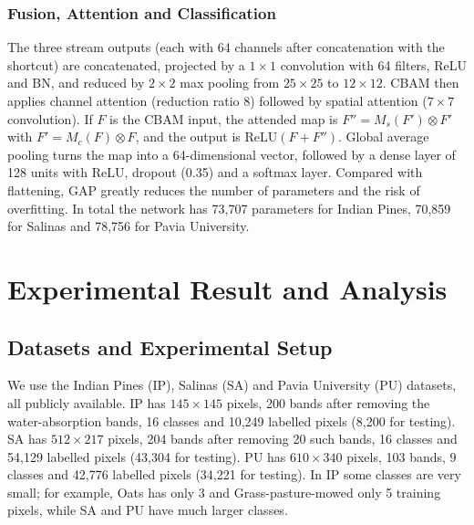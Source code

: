 \documentclass[conference]{IEEEtran}
\begin{document}
	
	\subsubsection{Fusion, Attention and Classification}
	The three stream outputs (each with 64 channels after concatenation with the shortcut) are concatenated, projected by a $1\times1$ convolution with 64 filters, ReLU and BN, and reduced by $2\times2$ max pooling from $25\times25$ to $12\times12$. CBAM\cite{cbam} then applies channel attention (reduction ratio 8) followed by spatial attention ($7\times7$ convolution). If $F$ is the CBAM input, the attended map is $F''=M_s(F')\otimes F'$ with $F'=M_c(F)\otimes F$, and the output is $\mathrm{ReLU}(F+F'')$. Global average pooling\cite{nin} turns the map into a 64-dimensional vector, followed by a dense layer of 128 units with ReLU, dropout (0.35) and a softmax layer. Compared with flattening, GAP greatly reduces the number of parameters and the risk of overfitting. In total the network has 73,707 parameters for Indian Pines, 70,859 for Salinas and 78,756 for Pavia University.
	
	\section{Experimental Result and Analysis} \label{experiment}
	\subsection{Datasets and Experimental Setup}
	We use the Indian Pines (IP), Salinas (SA) and Pavia University (PU) datasets, all publicly available. IP has $145\times145$ pixels, 200 bands after removing the water-absorption bands, 16 classes and 10,249 labelled pixels (8,200 for testing). SA has $512\times217$ pixels, 204 bands after removing 20 such bands, 16 classes and 54,129 labelled pixels (43,304 for testing). PU has $610\times340$ pixels, 103 bands, 9 classes and 42,776 labelled pixels (34,221 for testing). In IP some classes are very small; for example, Oats has only 3 and Grass-pasture-mowed only 5 training pixels, while SA and PU have much larger classes.
	
\end{document}
